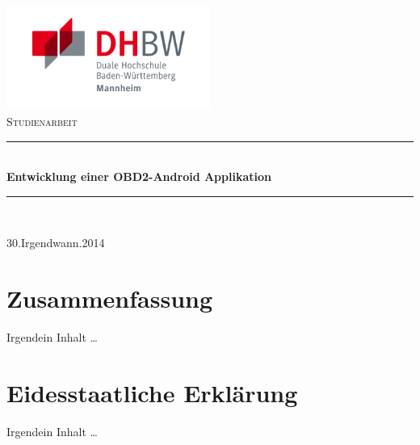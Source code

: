 \documentclass[4paper,10pt]{article}
\begin{document}
\begin{titlepage}
\begin{center}
\includegraphics[width=0.5\textwidth]{./abbildungen/titelseite/dhbw_logo.png}\\[1cm]
\textsc{\Large Studienarbeit}\\[0.5cm]
\newcommand{\HRule}{\rule{\linewidth}{0.3mm}}
\HRule \\[0.3cm]{ \huge \bfseries Entwicklung einer OBD2-Android Applikation}\\[0.3cm]
\HRule \\[1.5cm]
\begin{minipage}{0.4\textwidth}
\begin{flushleft} \large
{}
\end{flushleft}
\end{minipage}
\hfill
\begin{minipage}{0.4\textwidth}
\begin{flushright} \large
{}
\end{flushright}
\end{minipage}
\vfill
{\large 30.Irgendwann.2014}
\end{center}
\end{titlepage}


\renewcommand{\thesection}{\Roman{section}} 
\section{Zusammenfassung}
Irgendein Inhalt \ldots 
\newpage


\section{Eidesstaatliche Erklärung}
Irgendein Inhalt \ldots
\newpage
\end{document}
